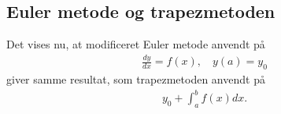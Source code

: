 \subsection*{Euler metode og trapezmetoden}
%
Det vises nu, at modificeret Euler metode anvendt på
\begin{align*}
\frac{dy}{dx}=f(x),\phantom{hi}y(a)=y_0
\end{align*}
%
giver samme resultat, som trapezmetoden anvendt på
%
\begin{align*}
y_0 + \int_a^b f(x) dx.
\end{align*}
%
